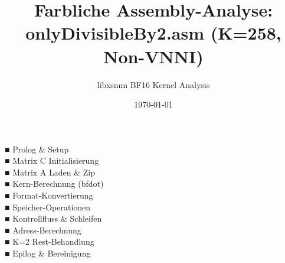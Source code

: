\documentclass[a4paper,10pt]{article}
\title{Farbliche Assembly-Analyse: onlyDivisibleBy2.asm (K=258, Non-VNNI)}
\author{libxsmm BF16 Kernel Analysis}
\date{\today}
\begin{document}
\maketitle

\begin{tcolorbox}[colback=gray!10, title=Legende der Farbkodierung]
\begin{multicols}{2}
\textcolor{prologue}{\textbf{■}} Prolog \& Setup \\
\textcolor{matrixc}{\textbf{■}} Matrix C Initialisierung \\
\textcolor{matrixa}{\textbf{■}} Matrix A Laden \& Zip \\
\textcolor{compute}{\textbf{■}} Kern-Berechnung (bfdot) \\
\textcolor{conversion}{\textbf{■}} Format-Konvertierung \\
\textcolor{storage}{\textbf{■}} Speicher-Operationen \\
\textcolor{control}{\textbf{■}} Kontrollfluss \& Schleifen \\
\textcolor{address}{\textbf{■}} Adress-Berechnung \\
\textcolor{remainder}{\textbf{■}} K=2 Rest-Behandlung \\
\textcolor{epilogue}{\textbf{■}} Epilog \& Bereinigung
\end{multicols}
\end{tcolorbox}

\newpage
\end{document}
